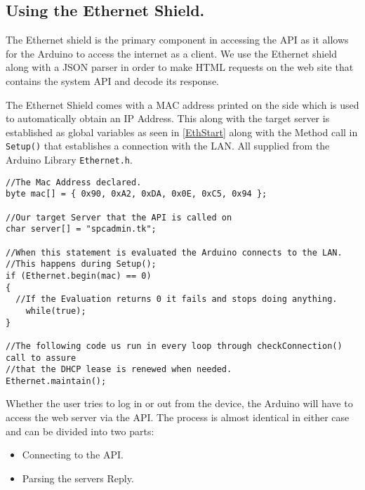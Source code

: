 \subsection{Using the Ethernet Shield.}
\label{sec:ethernetshield}
The Ethernet shield is the primary component in accessing the API as it allows for the Arduino to access the internet as a client.
We use the Ethernet shield along with a JSON parser in order to make HTML requests on the web site that contains the system API and decode its response.

The Ethernet Shield comes with a MAC address printed on the side which is used to automatically obtain an IP Address.
This along with the target server is established as global variables as seen in \autoref{EthStart} along with the Method call in \verb|Setup()| that establishes a connection with the LAN. All supplied from the Arduino Library \verb|Ethernet.h|.

\begin{lstlisting}[frame=single, label=EthStart, caption=The Method Calls used to establish and maintain a connection.]
//The Mac Address declared.
byte mac[] = { 0x90, 0xA2, 0xDA, 0x0E, 0xC5, 0x94 };

//Our target Server that the API is called on
char server[] = "spcadmin.tk";

//When this statement is evaluated the Arduino connects to the LAN.
//This happens during Setup();
if (Ethernet.begin(mac) == 0) 
{
  //If the Evaluation returns 0 it fails and stops doing anything.
	while(true); 
}

//The following code us run in every loop through checkConnection() call to assure
//that the DHCP lease is renewed when needed.
Ethernet.maintain();
\end{lstlisting}

Whether the user tries to log in or out from the device, the Arduino will have to access the web server via the API.
The process is almost identical in either case and can be divided into two parts:
\begin{itemize}
	\item Connecting to the API.
	\item Parsing the servers Reply.
\end{itemize}

